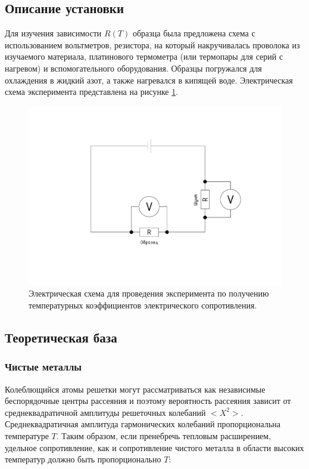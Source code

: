 \documentclass[a4paper, 12pt]{article}
\begin{document}
\subsection{Описание установки}

Для изучения зависимости $R(T)$ образца была предложена схема с использованием вольтметров, резистора, на который накручивалась проволока из изучаемого материала, платинового термометра (или термопары для серий с нагревом) и вспомогательного оборудования. Образцы погружался для охлаждения в жидкий азот, а также нагревался в кипящей воде. Электрическая схема эксперимента представлена на рисунке \ref{fig:1_scheme}.

\begin{figure}[H]
	\centering
	\includegraphics[width=\linewidth]{1_scheme}
	\caption{Электрическая схема для проведения эксперимента по получению температурных коэффициентов электрического сопротивления.}
	\label{fig:1_scheme}
\end{figure}

\subsection{Теоретическая база}

\subsubsection{Чистые металлы}

Колеблющийся атомы решетки могут рассматриваться как независимые беспорядочные центры рассеяния и поэтому вероятность рассеяния зависит от среднеквадратичной амплитуды решеточных колебаний $<\!X^2\!>$. Среднеквадратичная амплитуда гармонических колебаний пропорциональна температуре $T$. Таким образом, если пренебречь тепловым расширением, удельное сопротивление, как и сопротивление чистого металла в области высоких температур должно быть пропорционально $T$:
\end{document}
